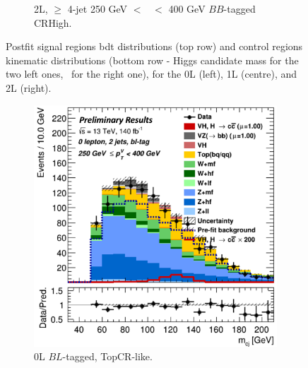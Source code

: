\begin{figure}[h!]
\begin{subfigure}[b]{0.32\textwidth}
        \caption{2L, $\geq$ 4-jet 250 GeV $<$ \ptv\ $<$ 400 GeV $BB$-tagged CRHigh.}
        \label{fig:posfit_2L_CR}
    \end{subfigure}
    \caption{Postfit signal regions \gls{bdt} distributions (top row) and control regions kinematic distributions (bottom row - Higgs candidate mass for the two left ones, \ptv\ for the right one), for the 0L (left), 1L (centre), and 2L (right).}
    \label{fig:postfit_SR_CR}
\end{figure} 

\begin{figure}[h!]
    \centering
    \begin{subfigure}[b]{0.32\textwidth}
        \centering
        \includegraphics[width=\textwidth]{Images/VH/Fit/fromSlides/Postfit/0LtopCRBL.png}
        \caption{0L $BL$-tagged, TopCR-like.}
        \label{fig:val_BLtopCR}
    \end{subfigure}
    \begin{subfigure}[b]{0.32\textwidth}
        \centering

\end{subfigure}
\end{figure}
